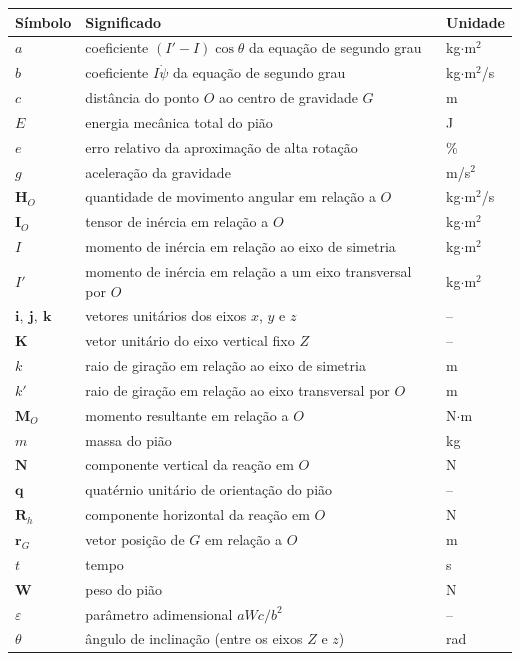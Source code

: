 \documentclass[12pt,a4paper]{article}
\newcommand{\vet}[1]{\mathbf{#1}}
\newcommand{\psid}{\dot{\psi}}
\newcommand{\eps}{\varepsilon}
\begin{document}
{\small
{}
\renewcommand{\arraystretch}{1.1}
\noindent
\begin{tabular}{@{}l p{9.3cm} l@{}}
\toprule
\textbf{Símbolo} & \textbf{Significado} & \textbf{Unidade}\\
\midrule
$a$ & coeficiente $(I'-I)\cos\theta$ da equação de segundo grau & kg$\cdot$m$^2$\\
$b$ & coeficiente $I\psid$ da equação de segundo grau & kg$\cdot$m$^2$/s\\
$c$ & distância do ponto $O$ ao centro de gravidade $G$ & m\\
$E$ & energia mecânica total do pião & J\\
$e$ & erro relativo da aproximação de alta rotação & \%\\
$g$ & aceleração da gravidade & m/s$^2$\\
$\vet{H}_O$ & quantidade de movimento angular em relação a $O$ & kg$\cdot$m$^2$/s\\
$\vet{I}_O$ & tensor de inércia em relação a $O$ & kg$\cdot$m$^2$\\
$I$ & momento de inércia em relação ao eixo de simetria & kg$\cdot$m$^2$\\
$I'$ & momento de inércia em relação a um eixo transversal por $O$ & kg$\cdot$m$^2$\\
$\vet{i},\ \vet{j},\ \vet{k}$ & vetores unitários dos eixos $x$, $y$ e $z$ & --\\
$\vet{K}$ & vetor unitário do eixo vertical fixo $Z$ & --\\
$k$ & raio de giração em relação ao eixo de simetria & m\\
$k'$ & raio de giração em relação ao eixo transversal por $O$ & m\\
$\vet{M}_O$ & momento resultante em relação a $O$ & N$\cdot$m\\
$m$ & massa do pião & kg\\
$\vet{N}$ & componente vertical da reação em $O$ & N\\
$\vet{q}$ & quatérnio unitário de orientação do pião & --\\
$\vet{R}_h$ & componente horizontal da reação em $O$ & N\\
$\vet{r}_G$ & vetor posição de $G$ em relação a $O$ & m\\
$t$ & tempo & s\\
$\vet{W}$ & peso do pião & N\\
$\eps$ & parâmetro adimensional $aWc/b^2$ & --\\
$\theta$ & ângulo de inclinação (entre os eixos $Z$ e $z$) & rad\\

\end{tabular}}
\end{document}
